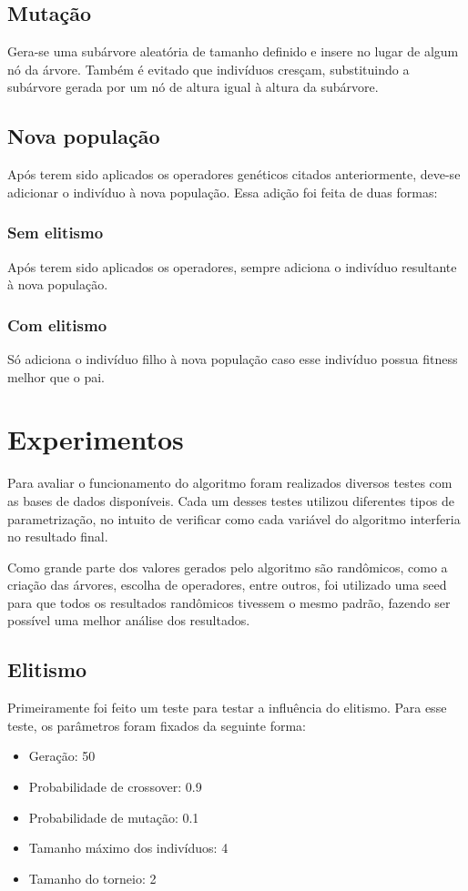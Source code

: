\documentclass[]{article}
\begin{document}
\subsection{Mutação}
Gera-se uma subárvore aleatória de tamanho definido e insere no lugar de algum nó da árvore. Também é evitado que indivíduos cresçam, substituindo a subárvore gerada por um nó de altura igual à altura da subárvore.

\subsection{Nova população}
Após terem sido aplicados os operadores genéticos citados anteriormente, deve-se adicionar o indivíduo à nova população. Essa adição foi feita de duas formas:

\subsubsection{Sem elitismo}
Após terem sido aplicados os operadores, sempre adiciona o indivíduo resultante à nova população.

\subsubsection{Com elitismo}
Só adiciona o indivíduo filho à nova população caso esse indivíduo possua fitness melhor que o pai.

\section{Experimentos}
Para avaliar o funcionamento do algoritmo foram realizados diversos testes com as bases de dados disponíveis. Cada um desses testes utilizou diferentes tipos de parametrização, no intuito de verificar como cada variável do algoritmo interferia no resultado final. 

Como grande parte dos valores gerados pelo algoritmo são randômicos, como a criação das árvores, escolha de operadores, entre outros, foi utilizado uma seed para que todos os resultados randômicos tivessem o mesmo padrão, fazendo ser possível uma melhor análise dos resultados.

\subsection{Elitismo}
Primeiramente foi feito um teste para testar a influência do elitismo. Para esse teste, os parâmetros foram fixados da seguinte forma:
\begin{itemize}
	\item Geração: 50
	\item Probabilidade de crossover: 0.9
	\item Probabilidade de mutação: 0.1
	\item Tamanho máximo dos indivíduos: 4
	\item Tamanho do torneio: 2 
\end{itemize}
\end{document}
